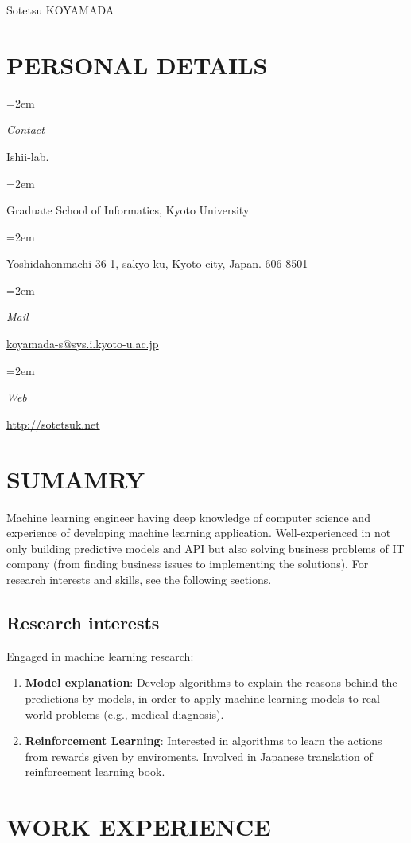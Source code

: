 \documentclass[paper=a4,fontsize=11pt]{scrartcl} %
\newlength{\spacebox}
\newcommand{\sepspace}{\vspace*{1em}}		%
\newcommand{\MyName}[1]{ %
		\Huge \usefont{OT1}{phv}{b}{n} \hfill #1
		\par \normalsize \normalfont}
\newcommand{\MySlogan}[1]{ %
		\large \usefont{OT1}{phv}{m}{n}\hfill \textit{#1}
		\par \normalsize \normalfont}
\newcommand{\NewPart}[1]{\section*{\uppercase{#1}}}
\newcommand{\PersonalEntry}[2]{
		\noindent\hangindent=2em\hangafter=0 %
		\parbox{\spacebox}{        %
		\textit{#1}}		       %
		\hspace{1.5em} #2 \par}    %
\begin{document}

\MyName{Sotetsu KOYAMADA}

\sepspace

\NewPart{Personal details}{}

\PersonalEntry{Contact}{Ishii-lab.}
\PersonalEntry{}{Graduate School of Informatics, Kyoto University}
\PersonalEntry{}{Yoshidahonmachi 36-1, sakyo-ku, Kyoto-city, Japan. 606-8501}
\PersonalEntry{Mail}{\url{koyamada-s@sys.i.kyoto-u.ac.jp}}
\PersonalEntry{Web}{\url{http://sotetsuk.net}}

\NewPart{Sumamry}{}

Machine learning engineer
having deep knowledge of computer science and
experience of developing machine learning application.
Well-experienced in not only building predictive models and API
but also solving business problems of IT company (from finding business issues to implementing the solutions).
For research interests and skills, see the following sections.

\subsection*{Research interests}
Engaged in machine learning research:

\begin{enumerate}
  \item {\bf Model explanation}: Develop algorithms to explain the reasons behind the predictions by models, in order to apply machine learning models to real world problems (e.g., medical diagnosis).
	\item {\bf Reinforcement Learning}: Interested in algorithms to learn the actions from rewards given by enviroments. Involved in Japanese translation of reinforcement learning book.
\end{enumerate}

\NewPart{Work experience}{}
\end{document}
